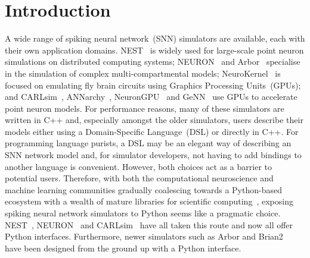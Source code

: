 \documentclass[utf8]{frontiersSCNS} %
\begin{document}
\section{Introduction}
A wide range of spiking neural network~(SNN) simulators are available, each with their own application domains. 
NEST~\citep{Gewaltig2007} is widely used for large-scale point neuron simulations on distributed computing systems; NEURON~\citep{carnevale2006neuron} and Arbor~\citep{Akar2019} specialise in the simulation of complex multi-compartmental models; NeuroKernel~\citep{Givon2016} is focused on emulating fly brain circuits using Graphics Processing Units~(GPUs); and CARLsim~\citep{Chou2018}, ANNarchy~\citep{Dinkelbach2015}, NeuronGPU~\citep{Golosio2020} and GeNN~\citep{Yavuz2016} use GPUs to accelerate point neuron models. 
For performance reasons, many of these simulators are written in C++ and, especially amongst the older simulators, users describe their models either using a Domain-Specific Language~(DSL) or directly in C++.
For programming language purists, a DSL may be an elegant way of describing an SNN network model and, for simulator developers, not having to add bindings to another language is convenient.
However, both choices act as a barrier to potential users.
Therefore, with both the computational neuroscience and machine learning communities gradually coalescing towards a Python-based ecosystem with a wealth of mature libraries for scientific computing~\citep{Hunter2007,VanDerWalt2011,Millman2011}, exposing spiking neural network simulators to Python seems like a pragmatic choice.
NEST~\citep{Eppler2009}, NEURON~\citep{Hines2009} and CARLsim~\citep{Balaji2020} have all taken this route and now all offer Python interfaces.
Furthermore, newer simulators such as Arbor and Brian2~\citep{Stimberg2019} have been designed from the ground up with a Python interface.
\end{document}
